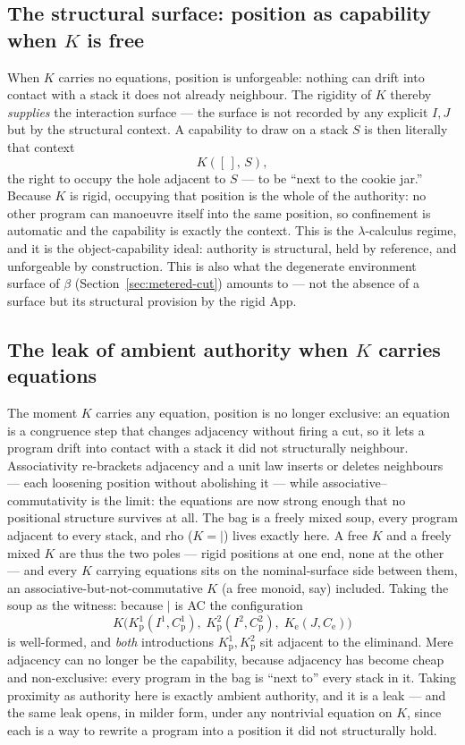 \documentclass[11pt]{article}
\theoremstyle{definition}
\theoremstyle{plain}
\newcommand{\Kctx}[1]{K([\,],\, #1)}
\newcommand{\Kp}{K_{\mathrm{p}}}
\newcommand{\Ke}{K_{\mathrm{e}}}
\newcommand{\Par}{\mathbin{|}}
\begin{document}
\subsection{The structural surface: position as capability when \texorpdfstring{$K$}{K} is free}

When $K$ carries no equations, position is unforgeable: nothing can drift
into contact with a stack it does not already neighbour. The rigidity of
$K$ thereby \emph{supplies} the interaction surface --- the surface is not
recorded by any explicit $I, J$ but by the structural context. A
capability to draw on a stack $S$ is then literally that context
\[
  \Kctx{S},
\]
the right to occupy the hole adjacent to $S$ --- to be ``next to the
cookie jar.'' Because $K$ is rigid, occupying that position is the whole
of the authority: no other program can manoeuvre itself into the same
position, so confinement is automatic and the capability is exactly the
context. This is the $\lambda$-calculus regime, and it is the
object-capability ideal: authority is structural, held by reference, and
unforgeable by construction. This is also what the degenerate environment
surface of $\beta$ (Section~\ref{sec:metered-cut}) amounts to --- not the
absence of a surface but its structural provision by the rigid
$\mathrm{App}$.

\subsection{The leak of ambient authority when \texorpdfstring{$K$}{K} carries equations}
\label{sec:ac-leak}

The moment $K$ carries any equation, position is no longer exclusive: an
equation is a congruence step that changes adjacency without firing a cut,
so it lets a program drift into contact with a stack it did not
structurally neighbour. Associativity re-brackets adjacency and a unit law
inserts or deletes neighbours --- each loosening position without
abolishing it --- while associative--commutativity is the limit: the
equations are now strong enough that no positional structure survives at
all. The bag is a freely mixed soup, every program adjacent to every
stack, and rho ($K = {\Par}$) lives exactly here. A free $K$ and a freely
mixed $K$ are thus the two poles --- rigid positions at one end, none at
the other --- and every $K$ carrying equations sits on the nominal-surface
side between them, an associative-but-not-commutative $K$ (a free monoid,
say) included. Taking the soup as the witness: because $\Par$ is AC the
configuration
\[
  K\bigl(\Kp^1(I^1,C_{\mathrm p}^1),\;
         \Kp^2(I^2,C_{\mathrm p}^2),\;
         \Ke(J,C_{\mathrm e})\bigr)
\]
is well-formed, and \emph{both} introductions $\Kp^1, \Kp^2$ sit adjacent
to the eliminand. Mere adjacency can no longer be the capability, because
adjacency has become cheap and non-exclusive: every program in the bag is
``next to'' every stack in it. Taking proximity as authority here is
exactly ambient authority, and it is a leak --- and the same leak opens,
in milder form, under any nontrivial equation on $K$, since each is a way
to rewrite a program into a position it did not structurally hold.
\end{document}
